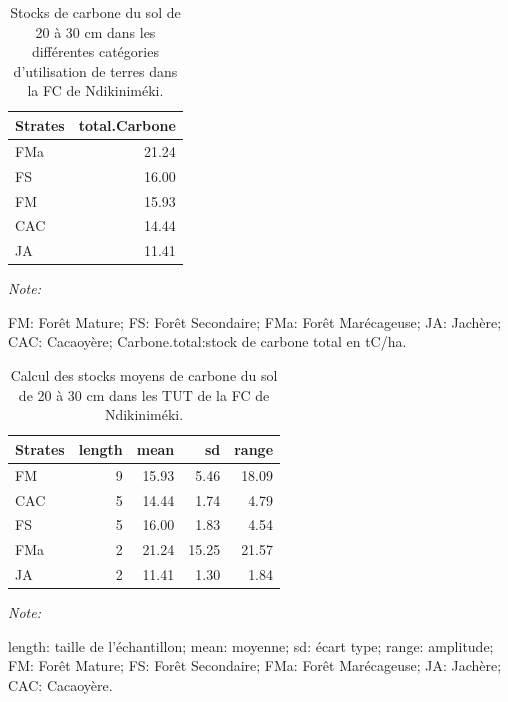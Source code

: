 \documentclass[
  12pt,
  a4paper,
  extrafontsizes,
  onecolumn,
  openright]{book}
\theoremstyle{definition}
\theoremstyle{definition}
\theoremstyle{definition}
\theoremstyle{definition}
\theoremstyle{remark}
\begin{document}
\begin{table}[H]
\centering
\caption{\label{tab:Stockscarbonesolde20-30cmNdikinimeki3}Stocks de carbone du sol de 20 à 30 cm dans les différentes catégories d'utilisation de terres dans la FC de Ndikiniméki.}
\centering
\begin{threeparttable}
\begin{tabular}[t]{lr}
\toprule
Strates & total.Carbone\\
\midrule
FMa & 21.24\\
FS & 16.00\\
FM & 15.93\\
CAC & 14.44\\
JA & 11.41\\
\bottomrule
\end{tabular}
\begin{tablenotes}
\item \textit{Note: } 
\item FM: Forêt Mature; FS: Forêt Secondaire; FMa: Forêt Marécageuse; JA: Jachère; CAC: Cacaoyère; Carbone.total:stock de carbone total en tC/ha.
\end{tablenotes}
\end{threeparttable}
\end{table}

\begin{table}[H]
\centering
\caption{\label{tab:Stocksmoyenssol20-30cmFCNdikinimeki}Calcul des stocks moyens de carbone du sol de 20 à 30 cm dans les TUT de la FC de Ndikiniméki.}
\centering
\begin{threeparttable}
\begin{tabular}[t]{lrrrr}
\toprule
Strates & length & mean & sd & range\\
\midrule
FM & 9 & 15.93 & 5.46 & 18.09\\
CAC & 5 & 14.44 & 1.74 & 4.79\\
FS & 5 & 16.00 & 1.83 & 4.54\\
FMa & 2 & 21.24 & 15.25 & 21.57\\
JA & 2 & 11.41 & 1.30 & 1.84\\
\bottomrule
\end{tabular}
\begin{tablenotes}
\item \textit{Note: } 
\item length: taille de l'échantillon; mean: moyenne; sd: écart type; range: amplitude; FM: Forêt Mature; FS: Forêt Secondaire; FMa: Forêt Marécageuse; JA: Jachère; CAC: Cacaoyère.
\end{tablenotes}
\end{threeparttable}
\end{table}
\end{document}
